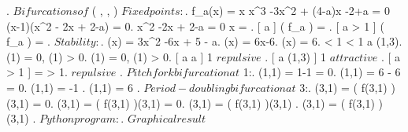 \documentclass[../Main/main]{subfiles}
\begin{document}
{
	{
		.
		{
		}
	}
	\study
	{
		$Bifurcations of $ ( \R, \N,  )
	}
	\start
	{
		$Fixed points:$.
		f_a(x) = x \ifandonlyif x^3 -3x^2 + (4-a)x -2+a = 0	\ifandonlyif (x-1)(x^2  - 2x + 2-a) = 0.
		x^2 -2x + 2-a = 0 \ifandonlyif x = \pm {}.
		[ a  ]
		{
			\fixed( f_a ) = 
		}.
		[ a > 1 ]
		{
			\fixed( f_a ) = 
		}.
		$Stability:$.
		(x) = 3x^2 -6x + 5 - a.
		(x) = 6x-6.
		(x) = 6.
		< 1 \ifandonlyif {} < 1 \ifandonlyif a \in (1,3).
		(1) = 0, (1) > 0.
		(1) = 0, (1) > 0.
		[ a  \logicOr a  ]
		{
			1 $ repulsive $
		}.
		[ a \in (1,3) ]
		{
			1 $ attractive $
		}.
		[ a > 1 ]
		{
			 =  > 1.
			\pm {} $ repulsive $
		}.
		$Pitchfork bifurcation at $ 1:.
		(1,1) = 1-1 = 0.
		(1,1) = 6 - 6 = 0.
		(1,1) = -1 .
		(1,1) = 6 .
		$Period-doubling bifurcation at $ 3:.
		(3,1) = ( f(3,1) )(3,1) = 0.
		(3,1) = ( f(3,1) )(3,1) = 0.
		(3,1) = ( f(3,1) )(3,1) .
		(3,1) = ( f(3,1) ) (3,1) .
		$Python program:$.
		$Graphical result$
	}
}
\end{document}
